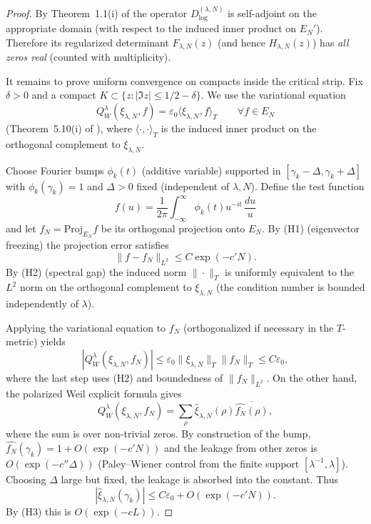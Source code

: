\documentclass[11pt,a4paper]{article}
\begin{document}
\begin{proof}
By Theorem~1.1(i) of \cite{ConnesConsaniMoscovici2025} the operator \(D_{\log}^{(\lambda,N)}\) is self-adjoint on the appropriate domain (with respect to the induced inner product on \(E_N'\)). Therefore its regularized determinant \(F_{\lambda,N}(z)\) (and hence \(H_{\lambda,N}(z)\)) has \emph{all zeros real} (counted with multiplicity).

It remains to prove uniform convergence on compacts inside the critical strip. Fix \(\delta>0\) and a compact \(K\subset\{z:|\Im z|\leq1/2-\delta\}\). We use the variational equation
\[
Q_W^\lambda(\xi_{\lambda,N},f)=\varepsilon_0\langle\xi_{\lambda,N},f\rangle_T\qquad\forall f\in E_N
\]
(Theorem~5.10(i) of \cite{ConnesConsaniMoscovici2025}), where \(\langle\cdot,\cdot\rangle_T\) is the induced inner product on the orthogonal complement to \(\xi_{\lambda,N}\).

Choose Fourier bumps \(\phi_k(t)\) (additive variable) supported in \([\gamma_k-\Delta,\gamma_k+\Delta]\) with \(\phi_k(\gamma_k)=1\) and \(\Delta>0\) fixed (independent of \(\lambda,N\)). Define the test function
\[
f(u) = \frac{1}{2\pi}\int_{-\infty}^{\infty}\phi_k(t)u^{-it}\,\frac{du}{u}
\]
and let \(f_N = \mathrm{Proj}_{E_N}f\) be its orthogonal projection onto \(E_N\). By (H1) (eigenvector freezing) the projection error satisfies
\[
\|f - f_N\|_{L^2}\leq C\exp(-c'N).
\]
By (H2) (spectral gap) the induced norm \(\|\cdot\|_T\) is uniformly equivalent to the \(L^2\) norm on the orthogonal complement to \(\xi_{\lambda,N}\) (the condition number is bounded independently of \(\lambda\)).

Applying the variational equation to \(f_N\) (orthogonalized if necessary in the \(T\)-metric) yields
\[
|Q_W^\lambda(\xi_{\lambda,N},f_N)| \leq \varepsilon_0 \|\xi_{\lambda,N}\|_T \|f_N\|_T \leq C\varepsilon_0,
\]
where the last step uses (H2) and boundedness of \(\|f_N\|_{L^2}\). On the other hand, the polarized Weil explicit formula gives
\[
Q_W^\lambda(\xi_{\lambda,N},f_N) = \sum_{\rho}\widehat{\xi}_{\lambda,N}(\rho)\overline{\widehat{f_N}(\rho)},
\]
where the sum is over non-trivial zeros. By construction of the bump, \(\widehat{f_N}(\gamma_k)=1+O(\exp(-c'N))\) and the leakage from other zeros is \(O(\exp(-c''\Delta))\) (Paley--Wiener control from the finite support \([\lambda^{-1},\lambda]\)). Choosing \(\Delta\) large but fixed, the leakage is absorbed into the constant. Thus
\[
|\widehat{\xi}_{\lambda,N}(\gamma_k)| \leq C\varepsilon_0 + O(\exp(-c'N)).
\]
By (H3) this is \(O(\exp(-cL))\).


\end{proof}
\end{document}
